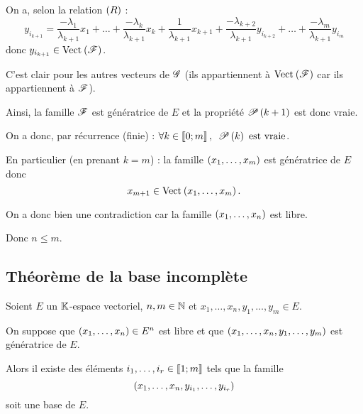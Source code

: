 \begin{dem}
On a, selon la relation \(\paren{R}\) : \[y_{i_{k+1}}=\dfrac{-\lambda_1}{\lambda_{k+1}}x_1+\dots+\dfrac{-\lambda_k}{\lambda_{k+1}}x_k+\dfrac{1}{\lambda_{k+1}}x_{k+1}+\dfrac{-\lambda_{k+2}}{\lambda_{k+1}}y_{i_{k+2}}+\dots+\dfrac{-\lambda_m}{\lambda_{k+1}}y_{i_m}\] donc \(y_{i_{k+1}}\in\Vect{\fami{F}}\).

C'est clair pour les autres vecteurs de \(\fami{G}\) (ils appartiennent à \(\Vect{\fami{F}}\) car ils appartiennent à \(\fami{F}\)).

Ainsi, la famille \(\fami{F}\) est génératrice de \(E\) et la propriété \(\P{k+1}\) est donc vraie.

On a donc, par récurrence (finie) : \(\quantifs{\forall k\in\interventierii{0}{m}}\P{k}\text{ est vraie}\).

En particulier (en prenant \(k=m\)) : la famille \(\paren{x_1,\dots,x_m}\) est génératrice de \(E\) donc \[x_{m+1}\in\Vect{x_1,\dots,x_m}.\]

On a donc bien une contradiction car la famille \(\paren{x_1,\dots,x_n}\) est libre.

Donc \(n\leq m\).
\end{dem}

\subsection{Théorème de la base incomplète}

\begin{theo}
Soient \(E\) un \(\K\)-espace vectoriel, \(n,m\in\N\) et \(x_1,\dots,x_n,y_1,\dots,y_m\in E\).

On suppose que \(\paren{x_1,\dots,x_n}\in E^n\) est libre et que \(\paren{x_1,\dots,x_n,y_1,\dots,y_m}\) est génératrice de \(E\).

Alors il existe des éléments \(i_1,\dots,i_r\in\interventierii{1}{m}\) tels que la famille \[\paren{x_1,\dots,x_n,y_{i_1},\dots,y_{i_r}}\] soit une base de \(E\).
\end{theo}

